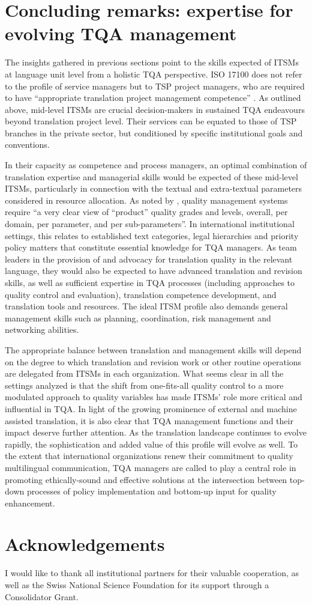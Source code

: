 \documentclass[output=paper]{langsci/langscibook}
\begin{document}
\section{Concluding remarks: expertise for evolving TQA management}\label{sec:prietoramos:4}


The insights gathered in previous sections point to the skills expected of ITSMs at language unit level from a holistic TQA perspective. ISO 17100 does not refer to the profile of service managers but to TSP project managers, who are required to have “appropriate translation project management competence” \citep[7]{ISO2015}. As outlined above, mid-level ITSMs are crucial decision-makers in sustained TQA endeavours beyond translation project level. Their services can be equated to those of TSP branches in the private sector, but conditioned by specific institutional goals and conventions. 

In their capacity as competence and process managers, an optimal combination of translation expertise and managerial skills would be expected of these mid-level ITSMs, particularly in connection with the textual and extra-textual parameters considered in resource allocation. As noted by \citet[275]{Gouadec2010}, quality management systems require “a very clear view of “product” quality grades and levels, overall, per domain, per parameter, and per sub-parameters”. In international institutional settings, this relates to established text categories, legal hierarchies and priority policy matters that constitute essential knowledge for TQA managers. As team leaders in the provision of and advocacy for translation quality in the relevant language, they would also be expected to have advanced translation and revision skills, as well as sufficient expertise in TQA processes (including approaches to quality control and evaluation), translation competence development, and translation tools and resources. The ideal ITSM profile also demands general management skills such as planning, coordination, risk management and networking abilities.

The appropriate balance between translation and management skills will depend on the degree to which translation and revision work or other routine operations are delegated from ITSMs in each organization. What seems clear in all the settings analyzed is that the shift from one-fits-all quality control to a more modulated approach to quality variables has made ITSMs’ role more critical and influential in TQA. In light of the growing prominence of external and machine assisted translation, it is also clear that TQA management functions and their impact deserve further attention. As the translation landscape continues to evolve rapidly, the sophistication and added value of this profile will evolve as well. To the extent that international organizations renew their commitment to quality multilingual communication, TQA managers are called to play a central role in promoting ethically-sound and effective solutions at the intersection between top-down processes of policy implementation and bottom-up input for quality enhancement.  


\section*{Acknowledgements} 
I would like to thank all institutional partners for their valuable cooperation, as well as the Swiss National Science Foundation for its support through a Consolidator Grant.
  
  
\sloppy
\printbibliography[heading=subbibliography,notkeyword=this] 
\end{document}
